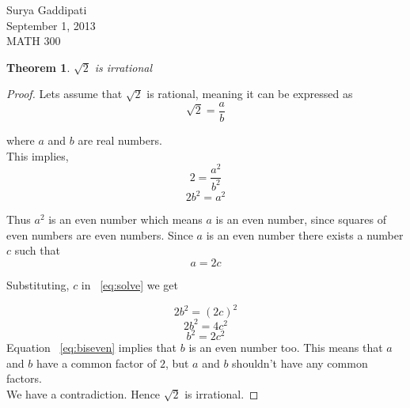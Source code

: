 \documentclass[12pt]{article}
\begin{document}
 

Surya Gaddipati\\
September 1, 2013\\
MATH 300 

\newtheorem*{KL}{Theorem }

\begin{KL} 
  $\sqrt 2$ is irrational 
\end{KL}
\begin{proof}
  Lets assume that $\sqrt 2$ is rational, meaning  it can be expressed as 
  \begin{equation}
    \sqrt{2} = \frac{a}{b}
  \end{equation}

  where $a$ and $b$ are real numbers.\\
  This implies,
  \begin{equation}
    2 = \frac{a^2}{b^2}
  \end{equation}
  \begin{equation}\label{eq:solve}
    2b^2 = a^2
  \end{equation}

  Thus $a^2$ is an even number which means $a$ is an even number, since squares of even numbers are even numbers.
  Since $a$ is an even number there exists a number $c$ such that 
  \begin{equation}
    a= 2c
  \end{equation}

  Substituting, $c$ in ~\ref{eq:solve} we get

  \begin{equation}
    2b^2 = (2c)^2
  \end{equation}
  \begin{equation}
    2b^2 = 4c^2
  \end{equation}
  \begin{equation}\label{eq:biseven}
    b^2 = 2c^2
  \end{equation}
  Equation ~\ref{eq:biseven} implies that $b$ is an even number too. This means that $a$ and $b$ have a common factor of $2$, but $a$ and $b$ shouldn't have any common factors.\\
  We have a contradiction. Hence $\sqrt 2$ is irrational.

\end{proof}
\end{document}
